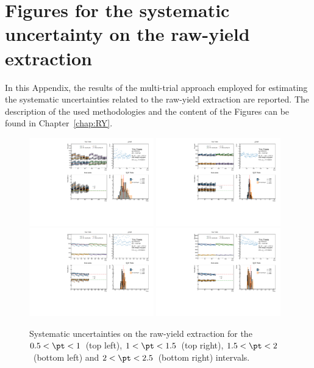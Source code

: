 \chapter[Figures for the systematic uncertainty on the raw yield extraction]{Figures for the systematic\\ uncertainty on the raw-yield\\ extraction}\label{app:RY}
In this Appendix, the results of the multi-trial approach employed for estimating the systematic uncertainties related to the raw-yield extraction are reported. The description of the used methodologies and the content of the Figures can be found in Chapter~\ref{chap:RY}.

\begin{figure}
    \centering
    \includegraphics[width=0.48\textwidth]{Figures/Chapter 5/AllPtBins/RawYieldSyst0.5_1.pdf}
    \includegraphics[width=0.48\textwidth]{Figures/Chapter 5/AllPtBins/RawYieldSyst1_1.5.pdf}
    \includegraphics[width=0.48\textwidth]{Figures/Chapter 5/AllPtBins/RawYieldSyst1.5_2.pdf}
    \includegraphics[width=0.48\textwidth]{Figures/Chapter 5/AllPtBins/RawYieldSyst2_2.5.pdf}
    \caption{Systematic uncertainties on the raw-yield extraction for the $0.5 < \pt < 1$~\gevc (top left), $1 < \pt < 1.5$~\gevc (top right), $1.5 < \pt < 2$~\gevc (bottom left) and $2 < \pt < 2.5$~\gevc (bottom right) intervals.}
\end{figure}


